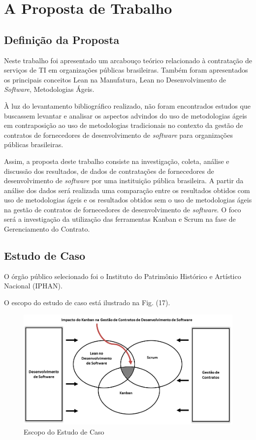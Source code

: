 \chapter[A Proposta de Trabalho]{A Proposta de Trabalho}

\section[Definição da Proposta]{Definição da Proposta}

Neste trabalho foi apresentado um arcabouço teórico relacionado à contratação de serviços de TI em organizações públicas brasileiras. Também foram apresentados os principais conceitos Lean na Manufatura, Lean no Desenvolvimento de \textit{Software}, Metodologias Ágeis.

À luz do levantamento bibliográfico realizado, não foram encontrados estudos que buscassem levantar e analisar os aspectos advindos do uso de metodologias ágeis em contraposição ao uso de metodologias tradicionais no contexto da gestão de contratos de fornecedores de desenvolvimento de \textit{software} para organizações públicas brasileiras.

Assim, a proposta deste trabalho consiste na investigação, coleta, análise e discussão dos resultados, de dados de contratações de fornecedores de desenvolvimento de \textit{software} por uma instituição pública brasileira. A partir da análise  dos dados será realizada uma comparação entre os resultados obtidos com uso de metodologias ágeis e os resultados obtidos sem o uso de metodologias ágeis na gestão de contratos de fornecedores de desenvolvimento de \textit{software}. O foco será a investigação da utilização das ferramentas Kanban e Scrum na fase de Gerenciamento do Contrato.


\section[Estudo de Caso]{Estudo de Caso}

O órgão público selecionado foi o Instituto do Patrimônio Histórico e Artístico Nacional (IPHAN).

O escopo do estudo de caso está ilustrado na Fig. (17). 
\begin{figure}[H]
		\centering
		\label{fig01}
			\includegraphics[scale=0.6]{figuras/escopoEC.png}
		\caption{Escopo do Estudo de Caso}
\end{figure}

